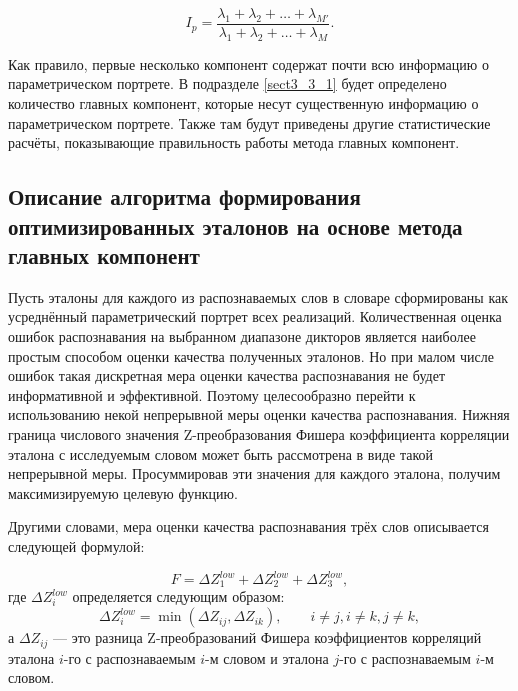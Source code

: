 \begin{equation} \label{eq:2_3_1_6}
I_p = \frac{\lambda_1 + \lambda_2 + \dots + \lambda_{M'}}{\lambda_1 + \lambda_2 + \dots + \lambda_M}.
\end{equation}

Как правило, первые несколько компонент содержат почти всю информацию о параметрическом портрете.
В подразделе \ref{sect3_3_1} будет определено количество главных компонент, которые несут существенную информацию о параметрическом портрете.
Также там будут приведены другие статистические расчёты, показывающие правильность работы метода главных компонент.


\subsection{Описание алгоритма формирования оптимизированных эталонов на основе метода главных компонент} \label{sect2_3_2}

Пусть эталоны для каждого из распознаваемых слов в словаре сформированы как усреднённый параметрический портрет всех реализаций.
Количественная оценка ошибок распознавания на выбранном диапазоне дикторов является наиболее простым способом оценки качества полученных эталонов.
Но при малом числе ошибок такая дискретная мера оценки качества распознавания не будет информативной и эффективной.
Поэтому целесообразно перейти к использованию некой непрерывной меры оценки качества распознавания.
Нижняя граница числового значения Z-преобразования Фишера коэффициента корреляции эталона с исследуемым словом может быть рассмотрена в виде такой непрерывной меры.
Просуммировав эти значения для каждого эталона, получим максимизируемую целевую функцию.

Другими словами, мера оценки качества распознавания трёх слов описывается следующей формулой:

\begin{equation} \label{eq:2_3_2_1}
F = \Delta Z^{low}_{1} + \Delta Z^{low}_{2} + \Delta Z^{low}_{3},
\end{equation}
где $\Delta Z^{low}_{i}$ определяется следующим образом:
\begin{equation} \label{eq:2_3_2_2}
\Delta Z^{low}_{i} = \min(\Delta Z_{ij}, \Delta Z_{ik}), \qquad i \ne j, i \ne k, j \ne k,
\end{equation}
а $\Delta Z_{ij}$ --- это разница Z-преобразований Фишера коэффициентов корреляций эталона $i$-го с распознаваемым $i$-м словом и эталона $j$-го с распознаваемым $i$-м словом.


